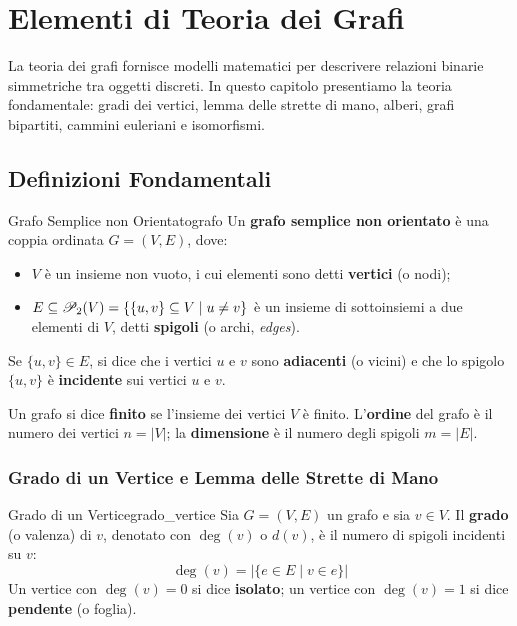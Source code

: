 \chapter{Elementi di Teoria dei Grafi}
\label{chap:grafi}

La teoria dei grafi fornisce modelli matematici per descrivere relazioni binarie simmetriche tra oggetti discreti. In questo capitolo presentiamo la teoria fondamentale: gradi dei vertici, lemma delle strette di mano, alberi, grafi bipartiti, cammini euleriani e isomorfismi.

\section{Definizioni Fondamentali}

\begin{definizione}{Grafo Semplice non Orientato}{grafo}
Un \textbf{grafo semplice non orientato} è una coppia ordinata $G = (V, E)$, dove:
\begin{itemize}
    \item $V$ è un insieme non vuoto, i cui elementi sono detti \textbf{vertici} (o nodi);
    \item $E \subseteq \mathscr{P}_2(V) = \{\{u, v\} \subseteq V \mid u \neq v\}$ è un insieme di sottoinsiemi a due elementi di $V$, detti \textbf{spigoli} (o archi, \emph{edges}).
\end{itemize}
Se $\{u, v\} \in E$, si dice che i vertici $u$ e $v$ sono \textbf{adiacenti} (o vicini) e che lo spigolo $\{u, v\}$ è \textbf{incidente} sui vertici $u$ e $v$.
\end{definizione}

Un grafo si dice \textbf{finito} se l'insieme dei vertici $V$ è finito.
L'\textbf{ordine} del grafo è il numero dei vertici $n = |V|$; la \textbf{dimensione} è il numero degli spigoli $m = |E|$.

\subsection{Grado di un Vertice e Lemma delle Strette di Mano}

\begin{definizione}{Grado di un Vertice}{grado_vertice}
Sia $G = (V, E)$ un grafo e sia $v \in V$. Il \textbf{grado} (o valenza) di $v$, denotato con $\deg(v)$ o $d(v)$, è il numero di spigoli incidenti su $v$:
\[
    \deg(v) = |\{e \in E \mid v \in e\}|
\]
Un vertice con $\deg(v) = 0$ si dice \textbf{isolato}; un vertice con $\deg(v) = 1$ si dice \textbf{pendente} (o foglia).
\end{definizione}

